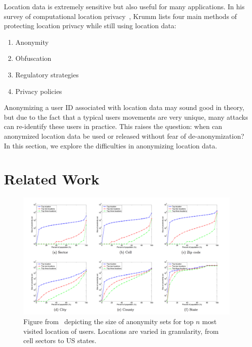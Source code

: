 Location data is extremely sensitive but also useful for many applications.
In his survey of computational location privacy~\cite{krumm2009survey}, Krumm lists four main methods of protecting location privacy while still using location data:
\begin{enumerate}
  \item Anonymity
  \item Obfuscation
  \item Regulatory strategies
  \item Privacy policies
\end{enumerate}
Anonymizing a user ID associated with location data may sound good in theory, but due to the fact that a typical users movements are very unique, many attacks can re-identify these users in practice.
This raises the question: when can anonymized location data be used or released without fear of de-anonymization?
In this section, we explore the difficulties in anonymizing location data.


\section{Related Work}

\begin{figure}[t]
  \centering
  \includegraphics[width=\linewidth]{fig/zang_bolot.png}
  \caption{Figure from~\cite{Zang:2011hk} depicting the size of anonymity sets for top $n$ most visited location of users.
           Locations are varied in granularity, from cell sectors to US states.}
  \label{fig:zang_bolot}
\end{figure}

